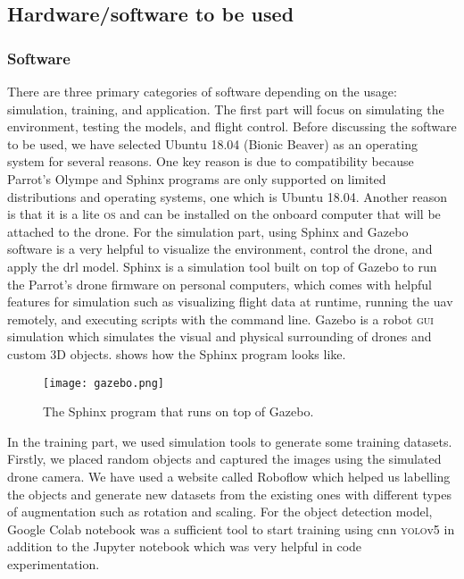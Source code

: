 \documentclass[../main.tex]{subfiles}
\begin{document}
\subsection{Hardware/software to be used}\label{sec:hardware-software}

\subsubsection{Software}
There are three primary categories of software 
depending on the usage: simulation, training, 
and application. The first part will focus on 
simulating the environment, testing the models, 
and flight control. Before discussing the software 
to be used, we have selected Ubuntu 18.04 (Bionic Beaver) 
as an operating system for several reasons. 
One key reason is due to compatibility because 
Parrot's Olympe and Sphinx programs are only 
supported on limited distributions and operating systems,
one which is Ubuntu 18.04. 
Another reason is that it is a lite \textsc{os} 
and can be installed on the onboard computer that 
will be attached to the drone. For the simulation part, 
using Sphinx and Gazebo software is a very helpful
to visualize the environment, control the drone, 
and apply the \gls{drl} model. Sphinx is a simulation 
tool built on top of Gazebo 
to run the Parrot's drone firmware on 
personal computers, which comes with helpful 
features for simulation such as visualizing flight 
data at runtime, running the \gls{uav} remotely, and executing scripts with the command line. 
Gazebo is a robot \textsc{gui} simulation 
which simulates the visual and physical surrounding 
of drones and custom 3D objects. 
 shows how the Sphinx 
program looks like. 

\begin{figure}[bt]
    \centering
    \texttt{[image: gazebo.png]}
    \caption{The Sphinx program that runs on top of Gazebo.}
    \label{fig:gazebo}
\end{figure}

In the training part, we used simulation tools to 
generate some training datasets. Firstly, 
we placed random objects and captured the images 
using the simulated drone camera. We have used a 
website called Roboflow which helped us labelling 
the objects and generate new datasets from the 
existing ones with different types of augmentation 
such as rotation and scaling. 
For the object detection model, Google Colab notebook 
was a sufficient tool to start training using 
\gls{cnn} \textsc{yolo}v5 in addition to the 
Jupyter notebook which was very helpful 
in code experimentation. 
\end{document}
